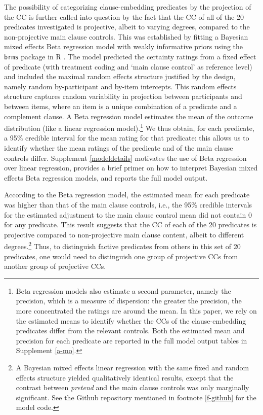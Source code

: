 \documentclass[11pt,fleqn]{article}
\newcommand{\6}{\mbox{$[\hspace*{-.6mm}[$}}
\newcommand{\9}{\mbox{$]\hspace*{-.6mm}]$}}
\begin{document}
The possibility of categorizing clause-embedding predicates by the projection of the CC is further called into question by the fact that the CC of all of the 20 predicates investigated is projective, albeit to varying degrees, compared to the non-projective main clause controls. This was established by fitting a Bayesian mixed effects Beta regression model  with weakly informative priors using the \verb|brms| \citep{buerkner2017}  package in R \citep{R}. The model predicted the certainty ratings from a fixed effect of predicate (with treatment coding and `main clause control' as  reference level) and included the maximal random effects structure justified by the design, namely random by-participant and by-item intercepts. This random effects structure captures random variability in projection between participants and between items, where an item is a unique combination of a predicate and a complement clause. A Beta regression model estimates the mean of the outcome distribution (like a linear regression model).\footnote{Beta regression models also estimate a second parameter, namely the precision, which is a measure of dispersion: the greater the precision, the more concentrated the ratings are around the mean. In this paper, we rely on the estimated means to identify whether the CCs of the clause-embedding predicates differ from the relevant controls. Both the estimated mean and precision for each predicate are reported in the full model output tables in Supplement \ref{a-mo}.} We thus obtain, for each predicate, a 95\% credible interval for the mean rating for that predicate: this allows us to identify whether the mean ratings of the predicate and of the main clause controls differ. Supplement \ref{modeldetails} motivates the use of Beta regression over linear regression, provides a brief primer on how to interpret Bayesian mixed effects Beta regression models, and reports the full model output.

According to the Beta regression model, the estimated mean for each predicate was higher than that of the main clause controls, i.e., the 95\% credible intervals for the estimated adjustment to the main clause control mean did not contain 0 for any predicate. This result suggests that the CC of each of the 20 predicates is projective compared to non-projective main clause content, albeit to different degrees.\footnote{A Bayesian mixed effects linear regression with the same fixed and random effects structure yielded qualitatively identical results, except that the contrast between \emph{pretend} and the main clause controls was only marginally significant. See the Github repository mentioned in footnote \ref{f-github} for the model code.} Thus, to distinguish factive predicates from others in this set of 20 predicates, one would need to distinguish one group of  projective CCs from another group of projective CCs.
\end{document}
